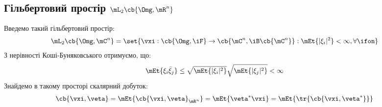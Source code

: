 \subsection{Гільбертовий простір $\mL_2\cb{\Omg,\mR^n}$}
Введемо такий гільбертовий простір:
\begin{equation}
\mL_2\cb{\Omg,\mC^n} = \set{\vxi:\cb{\Omg,\iF}\to\cb{\mC^n,\iB\cb{\mC^n}}:\mEt{|\xi_i|^2}<\infty,\forall\ifon}
\end{equation}
З нерівності Коші-Буняковського отримуємо, що:
\begin{equation}
\mEt{\xi_i\bar{\xi}_j}\leq \sqrt{\mEt{|\xi_i|^2}}\sqrt{\mEt{|\xi_j|^2}}< \infty
\end{equation}
Знайдемо в такому просторі скалярний добуток:
\begin{equation}\label{tr:3:2}
\cb{\vxi,\veta} = \mEt{\cb{\vxi,\veta}_{\mR^n}} = \mEt{\veta^\ast \vxi} = \mEt{\tr {\cb{\vxi,\veta^\ast}}}
\end{equation}
